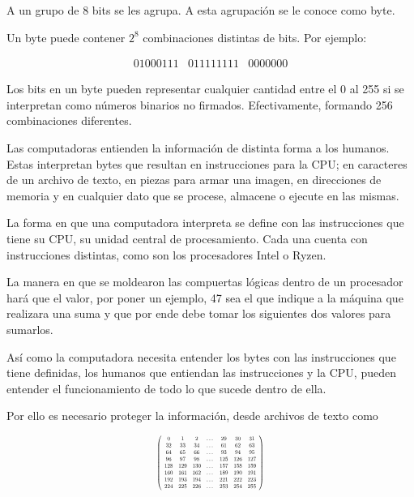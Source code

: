 \documentclass[a4paper]{article}
\newcommand*{\Scale}[2][4]{\scalebox{#1}{$#2$}}%
\begin{document}
A un grupo de 8 bits se les agrupa. A esta agrupación se le conoce como byte.

Un byte puede contener $2^8$ combinaciones distintas de bits. Por ejemplo:

\[
\begin{array}{ccc}
    01000111 & 011111111 & 0000000
\end{array}
\]

Los bits en un byte pueden representar cualquier cantidad entre el 0 al 255 si
se interpretan como números binarios no firmados. Efectivamente, formando 256
combinaciones diferentes.

Las computadoras entienden la información de distinta forma a los humanos.
Estas interpretan bytes que resultan en instrucciones para la CPU; en
caracteres de 
un archivo de texto, en piezas para armar una imagen, en direcciones de memoria
y en cualquier dato que se procese, almacene o ejecute en las mismas.

La forma en que una computadora interpreta se define con las instrucciones que
tiene su CPU, su unidad central de procesamiento. 
Cada una cuenta con instrucciones distintas, como son los procesadores Intel o
Ryzen.

La manera en que se moldearon las compuertas lógicas dentro de un procesador
hará que el valor, por poner un ejemplo, 47 sea el que 
indique a la máquina que realizara una suma y que por ende debe tomar los
siguientes dos valores para sumarlos.

Así como la computadora necesita entender los bytes con las instrucciones que
tiene definidas, los humanos que entiendan las instrucciones 
y la CPU, pueden entender el funcionamiento de todo lo que sucede dentro de
ella.

Por ello es necesario proteger la información, desde archivos de texto como 


\[
\Scale[0.5]{
\left(
\begin{array}{ccccccccc}
 0 & 1 & 2 & \dots & 29 & 30 & 31 \\
 32 & 33 & 34 & \dots & 61 & 62 & 63
\\
 64 & 65 & 66 & \dots & 93 & 94 & 95
\\
 96 & 97 & 98 & \dots & 125 & 126 & 127 \\
 128 & 129 & 130 & \dots & 157 & 158 & 159 \\
 160 & 161 & 162 & \dots & 189 & 190 & 191 \\
 192 & 193 & 194 & \dots & 221 & 222 & 223 \\
 224 & 225 & 226 & \dots & 253 & 254 & 255 \\
\end{array}
\right)
}
\]
\end{document}
